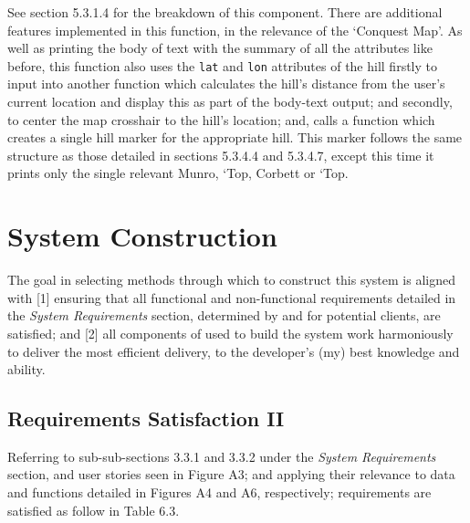 \documentclass[11pt, english]{article}
\begin{document}
	See section 5.3.1.4 for the breakdown of this component. There are additional features implemented in this function, in the relevance of the `Conquest Map'. As well as printing the body of text with the summary of all the attributes like before, this function also uses the \texttt{lat} and \texttt{lon} attributes of the hill firstly to input into another function which calculates the hill's distance from the user's current location and display this as part of the body-text output; and secondly, to center the map crosshair to the hill's location; and, calls a function which creates a single hill marker for the appropriate hill. This marker follows the same structure as those detailed in sections 5.3.4.4 and 5.3.4.7, except this time it prints only the single relevant Munro, `Top, Corbett or `Top.

\newpage

\section{System Construction}\label{ch6}

	The goal in selecting methods through which to construct this system is aligned with [1] ensuring that all functional and non-functional requirements detailed in the \textit{System Requirements} section, determined by and for potential clients, are satisfied; and [2] all components of used to build the system work harmoniously to deliver the most efficient delivery, to the developer's (my) best knowledge and ability.

	\subsection{Requirements Satisfaction II}

	Referring to sub-sub-sections 3.3.1 and 3.3.2 under the \textit{System Requirements} section, and user stories seen in Figure A3; and applying their relevance to data and functions detailed in Figures A4 and A6, respectively; requirements are satisfied as follow in Table 6.3.
\end{document}
